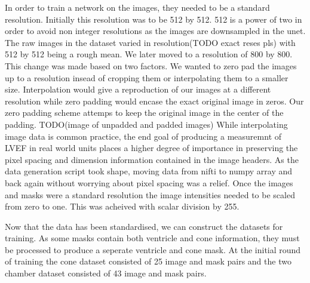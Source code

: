 \documentclass{article}
\begin{document}
{\par{}
In order to train a network on the images, they needed to be a standard resolution.
Initially this resolution was to be 512 by 512. 512 is a power of two in order to avoid non integer resolutions as the images are downsampled in the unet.
The raw images in the dataset varied in resolution(TODO exact reses pls) with 512 by 512 being a rough mean.
We later moved to a resolution of 800 by 800. This change was made based on two factors. 
We wanted to zero pad the images up to a resolution insead of cropping them or interpolating them to a smaller size.
Interpolation would give a reproduction of our images at a different resolution  while zero padding would encase the exact original image in zeros.
Our zero padding scheme attemps to keep the original image in the center of the padding.
TODO(image of unpadded and padded images)
While interpolating image data is common practice, the end goal of producing a measuremnt of LVEF in real world units places a higher degree of importance in preserving the pixel spacing and dimension information contained in the image headers.
As the data generation script took shape, moving data from nifti to numpy array and back again without worrying about pixel spacing was a relief.
Once the images and masks were a standard resolution the image intensities needed to be scaled from zero to one. This was acheived with scalar division by 255.
\par{}
Now that the data has been standardised, we can construct the datasets for training.
As some masks contain both ventricle and cone information, they must be processed to produce a seperate ventricle and cone mask.
At the initial round of training the cone dataset consisted of 25 image and mask pairs and the two chamber dataset consisted of 43 image and mask pairs.

}
\end{document}

